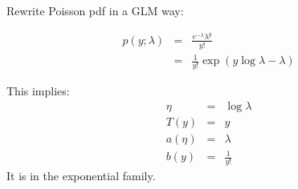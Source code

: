 \begin{answer}

Rewrite Poisson pdf in a GLM way:

\begin{eqnarray*}
p(y; \lambda) 
    &=& \frac{e^{-\lambda}\lambda^y}{y!} \\
    &=& \frac{1}{y!} \exp (y \log \lambda - \lambda)
\end{eqnarray*}

This implies:
\begin{eqnarray*}
    \eta &=& \log \lambda \\
    T(y) &=& y \\
    a(\eta) &=& \lambda \\
    b(y) &=& \frac{1}{y!}
\end{eqnarray*}
It is in the exponential family.

\end{answer}
